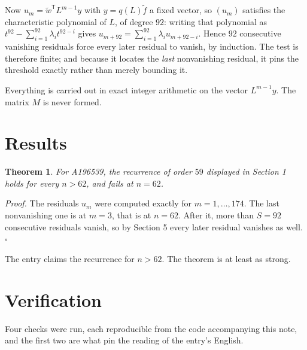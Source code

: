 \documentclass[11pt]{article}
\newtheorem{theorem}{Theorem}
\theoremstyle{definition}
\begin{document}
Now $u_m = \tilde w^{\mathsf T} L^{m-1} y$ with $y = q(L)\tilde f$ a fixed vector, so $(u_m)$ satisfies the characteristic polynomial of $L$, of degree $92$: writing that polynomial as $t^{92} - \sum_{i=1}^{92} \lambda_i t^{92-i}$ gives $u_{m+92} = \sum_{i=1}^{92} \lambda_i u_{m+92-i}$. Hence $92$ consecutive vanishing residuals force every later residual to vanish, by induction. The test is therefore finite; and because it locates the {\itshape last} nonvanishing residual, it pins the threshold exactly rather than merely bounding it.

Everything is carried out in exact integer arithmetic on the vector $L^{m-1}y$. The matrix $M$ is never formed.

\section{Results}

\begin{theorem} For A196539, the recurrence of order $59$ displayed in Section 1 holds for every $n > 62$, and fails at $n = 62$.\end{theorem}

{\itshape Proof.} The residuals $u_m$ were computed exactly for $m = 1,\dots,174$. The last nonvanishing one is at $m = 3$, that is at $n = 62$. After it, more than $S = 92$ consecutive residuals vanish, so by Section 5 every later residual vanishes as well. $\square$

The entry claims the recurrence for $n > 62$. The theorem is at least as strong.

\section{Verification}

Four checks were run, each reproducible from the code accompanying this note, and the first two are what pin the reading of the entry's English.
\end{document}
